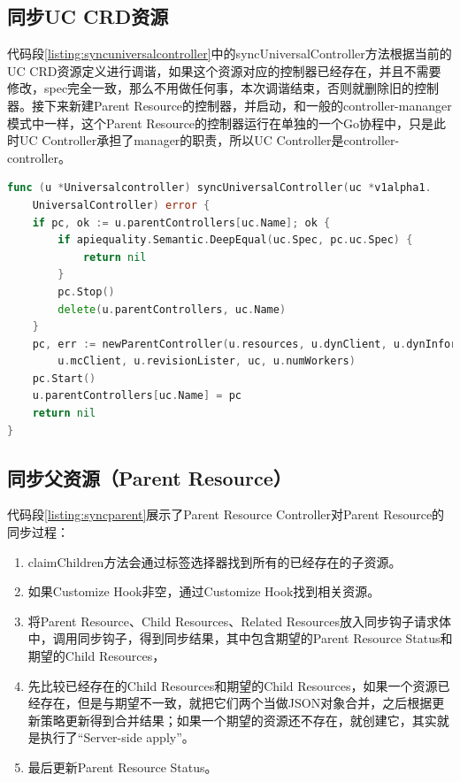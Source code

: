 \documentclass[macfonts,master]{njuthesis}
\begin{document}
\subsection{同步UC CRD资源}

代码段\ref{listing:syncuniversalcontroller}中的syncUniversalController方法根据当前的UC CRD资源定义进行调谐，如果这个资源对应的控制器已经存在，并且不需要修改，spec完全一致，那么不用做任何事，本次调谐结束，否则就删除旧的控制器。接下来新建Parent Resource的控制器，并启动，和一般的controller-mananger模式中一样，这个Parent Resource的控制器运行在单独的一个Go协程中，只是此时UC Controller承担了manager的职责，所以UC Controller是controller-controller。

\begin{lstlisting}[language=Go,caption=同步UC CRD,label=listing:syncuniversalcontroller]
func (u *Universalcontroller) syncUniversalController(uc *v1alpha1.
	UniversalController) error {
	if pc, ok := u.parentControllers[uc.Name]; ok {
		if apiequality.Semantic.DeepEqual(uc.Spec, pc.uc.Spec) {
			return nil
		}
		pc.Stop()
		delete(u.parentControllers, uc.Name)
	}
	pc, err := newParentController(u.resources, u.dynClient, u.dynInformers, 
		u.mcClient, u.revisionLister, uc, u.numWorkers)
	pc.Start()
	u.parentControllers[uc.Name] = pc
	return nil
}
\end{lstlisting}

\subsection{同步父资源（Parent Resource）}

代码段\ref{listing:syncparent}展示了Parent Resource Controller对Parent Resource的同步过程：
\begin{enumerate}
	\item claimChildren方法会通过标签选择器找到所有的已经存在的子资源。
	\item 如果Customize Hook非空，通过Customize Hook找到相关资源。
	\item 将Parent Resource、Child Resources、Related Resources放入同步钩子请求体中，调用同步钩子，得到同步结果，其中包含期望的Parent Resource Status和期望的Child Resources，
	\item 先比较已经存在的Child Resources和期望的Child Resources，如果一个资源已经存在，但是与期望不一致，就把它们两个当做JSON对象合并，之后根据更新策略更新得到合并结果；如果一个期望的资源还不存在，就创建它，其实就是执行了``Server-side apply''。
	\item 最后更新Parent Resource Status。
\end{enumerate}
\end{document}
